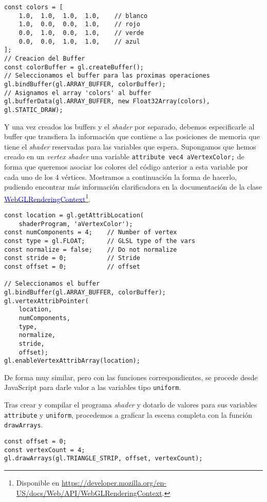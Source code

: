 \begin{lstlisting}
const colors = [
    1.0,  1.0,  1.0,  1.0,    // blanco
    1.0,  0.0,  0.0,  1.0,    // rojo
    0.0,  1.0,  0.0,  1.0,    // verde
    0.0,  0.0,  1.0,  1.0,    // azul
];
// Creacion del Buffer
const colorBuffer = gl.createBuffer();
// Seleccionamos el buffer para las proximas operaciones
gl.bindBuffer(gl.ARRAY_BUFFER, colorBuffer);
// Asignamos el array 'colors' al buffer
gl.bufferData(gl.ARRAY_BUFFER, new Float32Array(colors), gl.STATIC_DRAW);
\end{lstlisting}

Y una vez creados los buffers y el \textit{shader} por separado, debemos especificarle al buffer que transfiera la información que contiene a las posiciones de memoria que tiene el \textit{shader} reservadas para las variables que espera. Supongamos que hemos creado en un \textit{vertex shader} una variable \verb|attribute vec4 aVertexColor;| de forma que queremos asociar los colores del código anterior a esta variable por cada uno de los 4 vértices. Mostramos a continuación la forma de hacerlo, pudiendo encontrar más información clarificadora en la documentación de la clase \href{https://developer.mozilla.org/en-US/docs/Web/API/WebGLRenderingContext}{\textcolor{blue}{WebGLRenderingContext}}\footnote{Disponible en \url{https://developer.mozilla.org/en-US/docs/Web/API/WebGLRenderingContext}.}.

\begin{lstlisting}
const location = gl.getAttribLocation(
    shaderProgram, 'aVertexColor');
const numComponents = 4;    // Number of vertex
const type = gl.FLOAT;      // GLSL type of the vars
const normalize = false;    // Do not normalize
const stride = 0;           // Stride
const offset = 0;           // offset

// Seleccionamos el buffer
gl.bindBuffer(gl.ARRAY_BUFFER, colorBuffer);
gl.vertexAttribPointer(
    location,
    numComponents,
    type,
    normalize,
    stride,
    offset);
gl.enableVertexAttribArray(location);
\end{lstlisting}

De forma muy similar, pero con las funciones correspondientes, se procede desde JavaScript para darle valor a las variables tipo \verb|uniform|.

Tras crear y compilar el programa \textit{shader} y dotarlo de valores para sus variables \verb|attribute| y \verb|uniform|, procedemos a graficar la escena completa con la función \verb|drawArrays|.

\begin{lstlisting}
const offset = 0;
const vertexCount = 4;
gl.drawArrays(gl.TRIANGLE_STRIP, offset, vertexCount);
\end{lstlisting}

